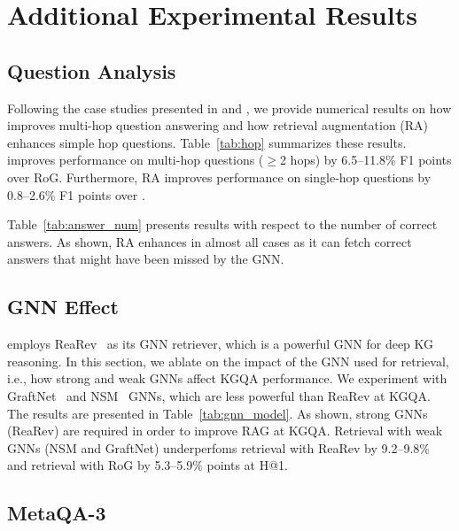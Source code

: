 \section{Additional Experimental Results} \label{app:exp-res}


\subsection{Question Analysis} \label{app:question}



Following the case studies presented in  and , we provide numerical results on how \grag improves multi-hop question answering and how retrieval augmentation (RA) enhances simple hop questions. Table~\ref{tab:hop} summarizes these results. \grag improves performance on multi-hop questions ($\geq$2 hops) by 6.5--11.8\% F1 points over RoG. Furthermore, RA improves performance on single-hop questions by 0.8--2.6\% F1 points over \grag. 



Table~\ref{tab:answer_num} presents results with respect to the number of correct answers. As shown, RA enhances \grag in almost all cases as it can fetch correct answers that might have been missed by the GNN. 


\subsection{GNN Effect}\label{app:gnn-model}




\grag employs ReaRev~\citep{mavromatis2022rearev} as its GNN retriever, which is a powerful GNN for deep KG reasoning. In this section, we ablate on the impact of the GNN used for retrieval, i.e., how strong and weak GNNs affect KGQA performance. We experiment with GraftNet~\citep{sun-etal-2018-open} and NSM~\citep{he2021improving} GNNs, which are less powerful than ReaRev at KGQA.
The results are presented in Table~\ref{tab:gnn_model}. As shown, strong GNNs (ReaRev) are required in order to improve RAG at KGQA. Retrieval with weak GNNs (NSM and GraftNet) underperfoms retrieval with ReaRev by 9.2--9.8\%  and retrieval with RoG by 5.3--5.9\% points at H@1.

\subsection{MetaQA-3}



